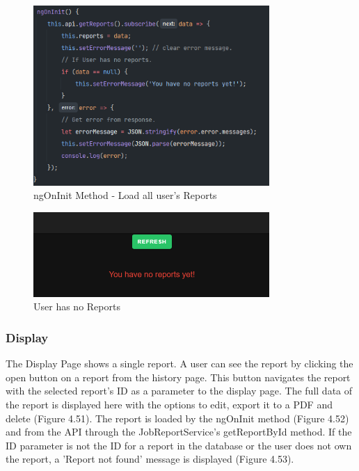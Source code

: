 \begin{figure}[H]
    \caption{ngOnInit Method - Load all user's Reports}
    \label{image:get_reports}
    \centering
    \includegraphics[width=0.8\textwidth]{images/repota/report_pages/get_reports.png}
\end{figure}

\begin{figure}[H]
    \caption{User has no Reports}
    \label{image:noReports}
    \centering
    \includegraphics[width=0.8\textwidth]{images/repota/UI/no_reports.png}
\end{figure}

\subsubsection{Display}
The Display Page shows a single report. A user can see the report by clicking the open button on a report from the history page. This button navigates the report with the selected report's ID as a parameter to the display page. The full data of the report is displayed here with the options to edit, export it to a PDF and delete (Figure 4.51). The report is loaded by the ngOnInit method (Figure 4.52) and from the API through the JobReportService's getReportById method. If the ID parameter is not the ID for a report in the database or the user does not own the report, a 'Report not found' message is displayed (Figure 4.53).  

